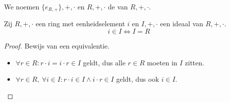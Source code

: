 \documentclass[main.tex]{subfiles}
\begin{document}
\begin{de}
  We noemen $\{e_{R,+}\},+,\cdot$ en $R,+,\cdot$ de  van $R,+,\cdot$.
\end{de}

\begin{st}
  \label{st:eenheidselement-in-ideaal-maakt-hele-ring}
  Zij $R,+,\cdot$ een ring met eenheidselement $i$ en $I,+,\cdot$ een ideaal van $R,+,\cdot$.
  \[ i \in I \Leftrightarrow I = R \]

  \begin{proof}
    Bewijs van een equivalentie.
    \begin{itemize}
    \item $\forall r\in R: r\cdot i = i \cdot r \in I$ geldt, dus alle $r\in R$ moeten in $I$ zitten.
    \item $\forall r\in R,\ \forall i\in I: r\cdot i \in I \wedge i \cdot r \in I$ geldt, dus ook $i \in I$.
    \end{itemize}
  \end{proof}
\end{st}
\end{document}
